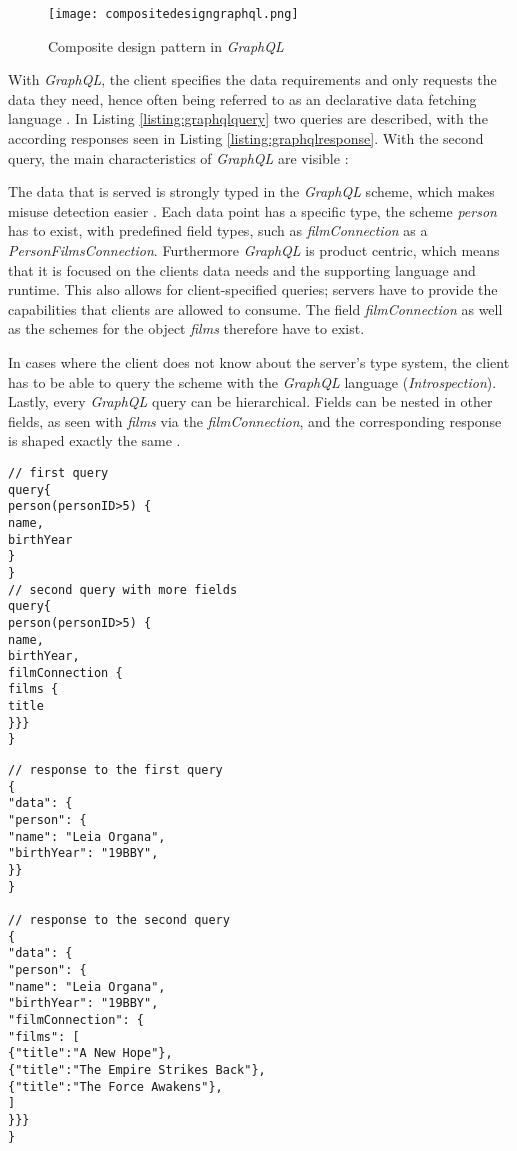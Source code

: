 \begin{figure}
	\centering
	\texttt{[image: compositedesigngraphql.png]}
	\caption{Composite design pattern in \textit{GraphQL} \cite{Lombard.2018}}
	\label{img:compositedesigngraphql}
\end{figure}

With \textit{GraphQL}, the client specifies the data requirements and only requests the data they need, hence often being referred to as an declarative data fetching language \cite[p.~6f.]{Buna.2016}.
In Listing \ref{listing:graphqlquery} two queries are described, with the according responses seen in Listing \ref{listing:graphqlresponse}.
With the second query, the main characteristics of \textit{GraphQL} are visible \cite[p.~16]{Porcello.2018}:

The data that is served is strongly typed in the \textit{GraphQL} scheme, which makes misuse detection easier \cite[p.~65]{Buna.2016}.
Each data point has a specific type, the scheme \textit{person} has to exist, with predefined field types, such as \textit{filmConnection} as a \textit{PersonFilmsConnection}.
Furthermore \textit{GraphQL} is product centric, which means that it is focused on the clients data needs and the supporting language and runtime.
This also allows for client-specified queries; servers have to provide the capabilities that clients are allowed to consume.
The field \textit{filmConnection} as well as the schemes for the object \textit{films} therefore have to exist.

In cases where the client does not know about the server's type system, the client has to be able to query the scheme with the \textit{GraphQL} language (\textit{Introspection}).
Lastly, every \textit{GraphQL} query can be hierarchical.
Fields can be nested in other fields, as seen with \textit{films} via the \textit{filmConnection}, and the corresponding response is shaped exactly the same \cite[p.~12ff.]{Porcello.2018}\cite[p.~10ff.]{Buna.2016}.

\begin{lstlisting}[caption=Example of GraphQL queries, label=listing:graphqlquery]
// first query
query{
person(personID>5) {
name,
birthYear
}
}
// second query with more fields
query{
person(personID>5) {
name,
birthYear,
filmConnection {
films {
title
}}}
}
\end{lstlisting}

\begin{lstlisting}[caption=Example of GraphQL responses, label=listing:graphqlresponse]
// response to the first query
{
"data": {
"person": {
"name": "Leia Organa",
"birthYear": "19BBY",
}}
}

// response to the second query
{
"data": {
"person": {
"name": "Leia Organa",
"birthYear": "19BBY",
"filmConnection": {
"films": [
{"title":"A New Hope"},
{"title":"The Empire Strikes Back"},
{"title":"The Force Awakens"},
]
}}}
}
\end{lstlisting}

